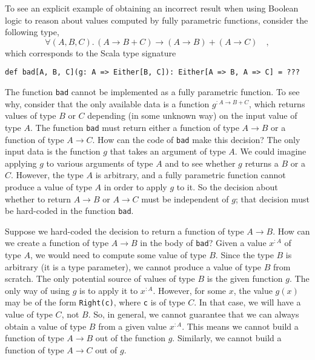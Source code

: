 To see an explicit example of obtaining an incorrect result when using
Boolean logic to reason about values computed by fully parametric
functions, consider the following type,
\begin{equation}
\forall(A,B,C).\,\left(A\rightarrow B+C\right)\rightarrow\left(A\rightarrow B\right)+\left(A\rightarrow C\right)\quad,\label{eq:ch-example-boolean-bad-type}
\end{equation}
which corresponds to the Scala type signature
\begin{lstlisting}
def bad[A, B, C](g: A => Either[B, C]): Either[A => B, A => C] = ???
\end{lstlisting}
The function \lstinline!bad! cannot be implemented as a fully parametric
function. To see why, consider that the only available data is a function
$g^{:A\rightarrow B+C}$, which returns values of type $B$ or $C$
depending (in some unknown way) on the input value of type $A$. The
function \lstinline!bad! must return either a function of type $A\rightarrow B$
or a function of type $A\rightarrow C$. How can the code of \lstinline!bad!
make this decision? The only input data is the function $g$ that
takes an argument of type $A$. We could imagine applying $g$ to
various arguments of type $A$ and to see whether $g$ returns a $B$
or a $C$. However, the type $A$ is arbitrary, and a fully parametric
function cannot produce a value of type $A$ in order to apply $g$
to it. So the decision about whether to return $A\rightarrow B$ or
$A\rightarrow C$ must be independent of $g$; that decision must
be hard-coded in the function \lstinline!bad!.

Suppose we hard-coded the decision to return a function of type $A\rightarrow B$.
How can we create a function of type $A\rightarrow B$ in the body
of \lstinline!bad!? Given a value $x^{:A}$ of type $A$, we would
need to compute some value of type $B$. Since the type $B$ is arbitrary
(it is a type parameter), we cannot produce a value of type $B$ from
scratch. The only potential source of values of type $B$ is the given
function $g$. The only way of using $g$ is to apply it to $x^{:A}$.
However, for some $x$, the value $g(x)$ may be of the form \lstinline!Right(c)!,
where \lstinline!c! is of type $C$. In that case, we will have a
value of type $C$, not $B$. So, in general, we cannot guarantee
that we can always obtain a value of type $B$ from a given value
$x^{:A}$. This means we cannot build a function of type $A\rightarrow B$
out of the function $g$. Similarly, we cannot build a function of
type $A\rightarrow C$ out of $g$. 

